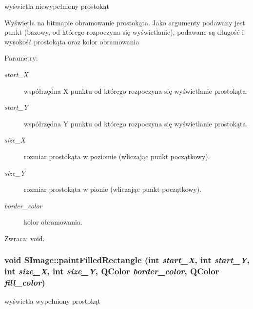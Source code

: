 wyświetla niewypełniony prostokąt 

Wyświetla na bitmapie obramowanie prostokąta. Jako argumenty podawany jest punkt (bazowy, od którego rozpoczyna się wyświetlanie), podawane są długość i wysokość prostokąta oraz kolor obramowania \begin{Desc}
\item[Parametry:]
\begin{description}
\item[{\em start\_\-X}]współrzędna X punktu od którego rozpoczyna się wyświetlanie prostokąta. \item[{\em start\_\-Y}]współrzędna Y punktu od którego rozpoczyna się wyświetlanie prostokąta. \item[{\em size\_\-X}]rozmiar prostokąta w poziomie (wliczając punkt początkowy). \item[{\em size\_\-Y}]rozmiar prostokąta w pionie (wliczając punkt początkowy). \item[{\em border\_\-color}]kolor obramowania. \end{description}
\end{Desc}
\begin{Desc}
\item[Zwraca:]void. \end{Desc}
\hypertarget{classSImage_dc89f8b2607722f6fbf52f481103bf71}{
\subsubsection{\setlength{\rightskip}{0pt plus 5cm}void SImage::paintFilledRectangle (int {\em start\_\-X}, \/  int {\em start\_\-Y}, \/  int {\em size\_\-X}, \/  int {\em size\_\-Y}, \/  QColor {\em border\_\-color}, \/  QColor {\em fill\_\-color})}}
\label{classSImage_dc89f8b2607722f6fbf52f481103bf71}


wyświetla wypełniony prostokąt 

